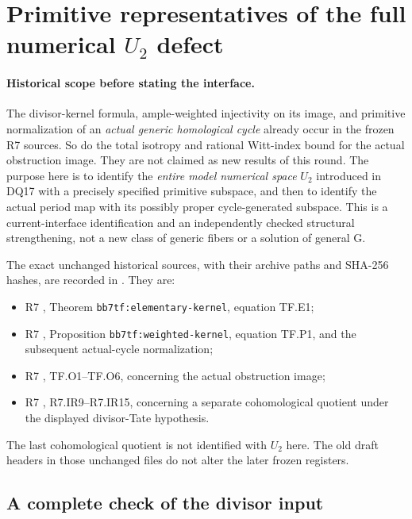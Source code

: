 \section{Primitive representatives of the full numerical $U_2$ defect}
\label{r18pu:section}

\paragraph{Historical scope before stating the interface.}
The divisor-kernel formula, ample-weighted injectivity on its image,
and primitive normalization of an \emph{actual generic homological
cycle} already occur in the frozen R7 sources.  So do the total
isotropy and rational Witt-index bound for the actual obstruction
image.  They are not claimed as new results of this round.
The purpose here is to identify the \emph{entire model numerical
space} $U_2$ introduced in DQ17 with a precisely specified primitive
subspace, and then to identify the actual period map with its
possibly proper cycle-generated subspace.  This is a current-interface
identification and an independently checked structural strengthening,
not a new class of generic fibers or a solution of general G.

The exact unchanged historical sources, with their archive paths
and SHA-256 hashes, are recorded in
.  They are:
\begin{itemize}
\item R7 , Theorem
      \texttt{bb7tf:elementary-kernel}, equation TF.E1;
\item R7 ,
      Proposition \texttt{bb7tf:weighted-kernel}, equation TF.P1,
      and the subsequent actual-cycle normalization;
\item R7 ,
      TF.O1--TF.O6, concerning the actual obstruction image;
\item R7 ,
      R7.IR9--R7.IR15, concerning a separate cohomological quotient
      under the displayed divisor-Tate hypothesis.
\end{itemize}
The last cohomological quotient is not identified with $U_2$ here.
The old draft headers in those unchanged files do not alter the
later frozen registers.

\subsection{A complete check of the divisor input}

